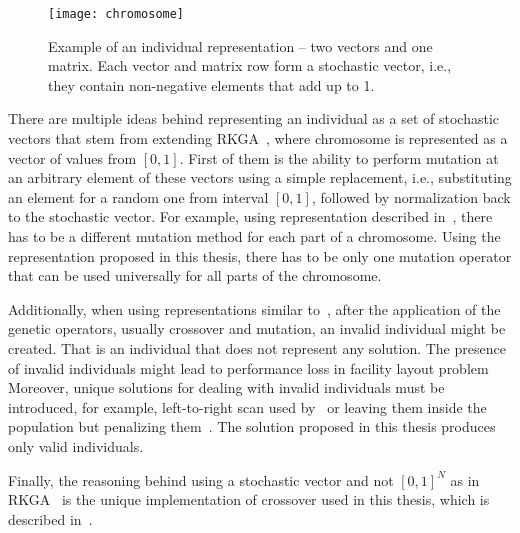 \begin{figure}[htp]
    \texttt{[image: chromosome]}\caption[Example of an individual representation]{
        Example of an individual representation – two vectors and one matrix.
        Each vector and matrix row form a stochastic vector, i.e., they contain non-negative elements that add up to 1.
    }
    \label{fig:chromosome}
\end{figure}

There are multiple ideas behind representing an individual as a set of stochastic vectors that stem
from extending RKGA~\cite{beanGeneticAlgorithmsRandom1994}, where chromosome is represented as a vector of values from $[0,1]$. 
First of them is the ability to perform mutation at an arbitrary element of these vectors using
a simple replacement, i.e., substituting an element for a random one from interval $[0,1]$,
followed by normalization back to the stochastic vector.
For example, using representation described in~\cite{friedrichIntegratedSlicingTree2018, riponAdaptiveVariableNeighborhood2013},
there has to be a different mutation method for each part of a chromosome.
Using the representation proposed in this thesis, there has to be only one mutation operator that can be used universally for all parts of the chromosome.

Additionally, when using representations similar to~\cite{friedrichIntegratedSlicingTree2018, riponAdaptiveVariableNeighborhood2013},
after the application of the genetic operators, usually crossover and mutation, an invalid individual might be created.
That is an individual that does not represent any solution.
The presence of invalid individuals might lead to performance loss in facility layout problem~\cite{liuMultiimprovedGeneticAlgorithm2012}
Moreover, unique solutions for dealing with invalid individuals must be introduced,
for example, left-to-right scan used by~\cite{hwangGeneticAlgorithmApproach2009, kandasamyEffectiveLocationMicro2020}
or leaving them inside the population but penalizing them~\cite{hwangGeneticAlgorithmApproach2009}.
The solution proposed in this thesis produces only valid individuals.

Finally, the reasoning behind using a stochastic vector and not $[0,1]^N$ as in RKGA~\cite{beanGeneticAlgorithmsRandom1994}
is the unique implementation of crossover used in this thesis, which is described in~\cite{subsec:crossover}.


